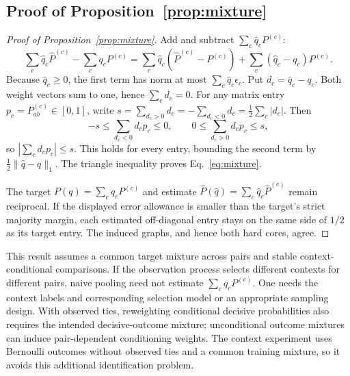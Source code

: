 \subsection{Proof of Proposition~\ref{prop:mixture}}
\begin{proof}[Proof of Proposition~\ref{prop:mixture}]
Add and subtract $\sum_c\widehat q_cP^{(c)}$:
\[
\sum_c\widehat q_c\widehat P^{(c)}-\sum_cq_cP^{(c)}
=\sum_c\widehat q_c(\widehat P^{(c)}-P^{(c)})
+\sum_c(\widehat q_c-q_c)P^{(c)}.
\]
Because $\widehat q_c\ge0$, the first term has norm at most $\sum_c\widehat q_c\epsilon_c$. Put $d_c=\widehat q_c-q_c$. Both weight vectors sum to one, hence $\sum_cd_c=0$. For any matrix entry $p_c=P^{(c)}_{ab}\in[0,1]$, write $s=\sum_{d_c>0}d_c=-\sum_{d_c<0}d_c=\tfrac12\sum_c|d_c|$. Then
\[
-s\le\sum_{d_c<0}d_cp_c\le0,
\qquad 0\le\sum_{d_c>0}d_cp_c\le s,
\]
so $|\sum_cd_cp_c|\le s$. This holds for every entry, bounding the second term by $\tfrac12\|\widehat q-q\|_1$. The triangle inequality proves Eq.~\eqref{eq:mixture}.

The target $P(q)=\sum_cq_cP^{(c)}$ and estimate $\widehat P(\widehat q)=\sum_c\widehat q_c\widehat P^{(c)}$ remain reciprocal. If the displayed error allowance is smaller than the target's strict majority margin, each estimated off-diagonal entry stays on the same side of $1/2$ as its target entry. The induced graphs, and hence both hard cores, agree.
\end{proof}
This result assumes a common target mixture across pairs and stable context-conditional comparisons. If the observation process selects different contexts for different pairs, naive pooling need not estimate $\sum_cq_cP^{(c)}$. One needs the context labels and corresponding selection model or an appropriate sampling design. With observed ties, reweighting conditional decisive probabilities also requires the intended decisive-outcome mixture; unconditional outcome mixtures can induce pair-dependent conditioning weights. The context experiment uses Bernoulli outcomes without observed ties and a common training mixture, so it avoids this additional identification problem.

